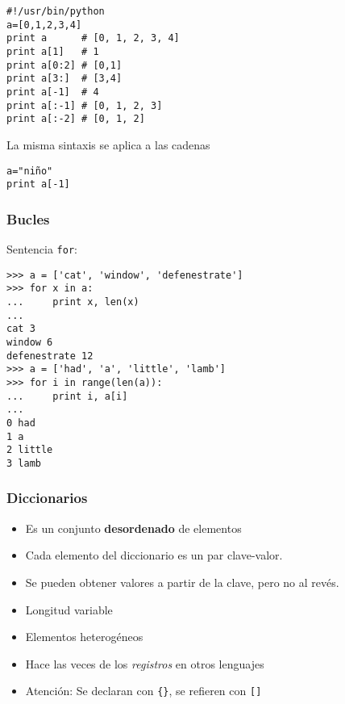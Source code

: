 \begin{frame}[fragile]
  \begin{footnotesize}
\begin{verbatim}
#!/usr/bin/python
a=[0,1,2,3,4]
print a      # [0, 1, 2, 3, 4]
print a[1]   # 1 
print a[0:2] # [0,1]
print a[3:]  # [3,4]
print a[-1]  # 4
print a[:-1] # [0, 1, 2, 3]
print a[:-2] # [0, 1, 2]
\end{verbatim}
  \end{footnotesize}
  \begin{center}
La misma sintaxis se aplica a las cadenas
  \end{center}

  \begin{footnotesize}
\begin{verbatim}
a="niño"
print a[-1]
\end{verbatim}
  \end{footnotesize}


\end{frame}


\begin{frame}[fragile]

\frametitle{ Bucles}
Sentencia \verb|for|:

\begin{footnotesize}
\begin{verbatim}
>>> a = ['cat', 'window', 'defenestrate']
>>> for x in a:
...     print x, len(x)
... 
cat 3
window 6
defenestrate 12
>>> a = ['had', 'a', 'little', 'lamb']
>>> for i in range(len(a)):
...     print i, a[i]
... 
0 had
1 a
2 little
3 lamb
\end{verbatim}
\end{footnotesize}

\end{frame}





\begin{frame}[fragile]
\frametitle{Diccionarios}  

\begin{itemize}
\item Es un conjunto {\bf desordenado} de elementos 
\item Cada elemento del diccionario es un par clave-valor. 
\item Se pueden obtener valores a partir de la clave, pero no al revés.
\item Longitud variable
\item Elementos heterogéneos
\item Hace las veces de los \emph{registros} en otros lenguajes
\item Atención: Se declaran con \verb|{}|, se refieren con \verb|[]|
\end{itemize}
\end{frame}



